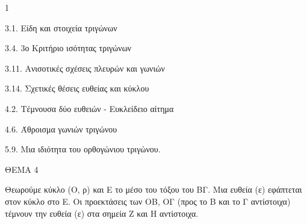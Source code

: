 \begin{ylh}{1}
    \item 3.1. Είδη και στοιχεία τριγώνων
    \item 3.4. 3ο Κριτήριο ισότητας τριγώνων
    \item 3.11. Ανισοτικές σχέσεις πλευρών και γωνιών
    \item 3.14. Σχετικές θέσεις ευθείας και κύκλου
    \item 4.2. Τέμνουσα δύο ευθειών - Ευκλείδειο αίτημα
    \item 4.6. Άθροισμα γωνιών τριγώνου
    \item 5.9. Μια ιδιότητα του ορθογώνιου τριγώνου.
\end{ylh}

ΘΕΜΑ 4

Θεωρούμε κύκλο (Ο, ρ) και Ε το μέσο του τόξου του ΒΓ. Μια ευθεία (ε) εφάπτεται στον κύκλο στο Ε. Οι προεκτάσεις των ΟΒ, ΟΓ (προς το Β και το Γ αντίστοιχα) τέμνουν την ευθεία (ε) στα σημεία Ζ και Η αντίστοιχα.

